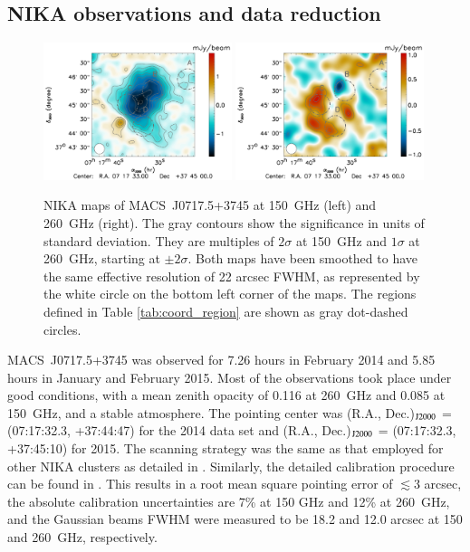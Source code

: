 \documentclass[twocolumn,traditabstract]{aa}
\begin{document}
\subsection{NIKA observations and data reduction}\label{sec:NIKA_observations_and_data_reduction}
\begin{figure}[h]
\centering
\includegraphics[width=0.49\textwidth]{Figure/MACSJ0717_2mm_map.pdf}
\includegraphics[width=0.49\textwidth]{Figure/MACSJ0717_1mm_map.pdf}
\caption{\footnotesize{NIKA maps of \mbox{MACS~J0717.5+3745} at 150~GHz (left) and 260~GHz (right). The gray contours show the significance in units of standard deviation. They are multiples of $2 \sigma$ at 150~GHz and $1 \sigma$ at 260~GHz, starting at $\pm 2 \sigma$. Both maps have been smoothed to have the same effective resolution of 22 arcsec FWHM, as represented by the white circle on the bottom left corner of the maps. The regions defined in Table \ref{tab:coord_region} are shown as gray dot-dashed circles.}}
\label{fig:NIKA_raw_maps}
\end{figure}
\mbox{MACS~J0717.5+3745} was observed for 7.26 hours in February 2014 and 5.85 hours in January and February 2015. Most of the observations took place under good conditions, with a mean zenith opacity of 0.116 at 260~GHz and 0.085 at 150~GHz, and a stable atmosphere. The pointing center was (R.A., Dec.)$_{\rm J2000}$ = (07:17:32.3, +37:44:47) for the 2014 data set and (R.A., Dec.)$_{\rm J2000}$ = (07:17:32.3, +37:45:10) for 2015. The scanning strategy was the same as that employed for other NIKA clusters as detailed in \cite{Adam2015,Adam2016}. Similarly, the detailed calibration procedure can be found in \cite{Adam2014,Adam2015}. This results in a root mean square pointing error of $\lesssim 3$ arcsec, the absolute calibration uncertainties are 7\% at 150 GHz and 12\% at 260~GHz, and the Gaussian beams FWHM were measured to be 18.2 and 12.0 arcsec at 150 and 260~GHz, respectively.
\end{document}
